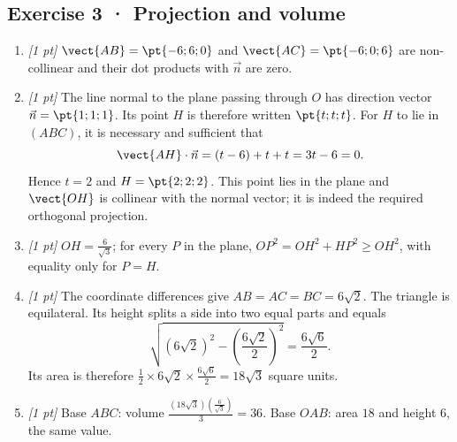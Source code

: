 \subsection*{Exercise 3 · Projection and volume}\begin{enumerate}

\item \textit{[1 pt]} $\vect{AB}=\pt{-6;6;0}$ and $\vect{AC}=\pt{-6;0;6}$ are non-collinear and their dot products with $\vec n$ are zero.

\item \textit{[1 pt]} The line normal to the plane passing through $O$ has direction vector $\vec n=\pt{1;1;1}$. Its point $H$ is therefore written $\pt{t;t;t}$. For $H$ to lie in $(ABC)$, it is necessary and sufficient that
\[\vect{AH}\cdot\vec n=(t-6)+t+t=3t-6=0.\]
Hence $t=2$ and $H=\pt{2;2;2}$. This point lies in the plane and $\vect{OH}$ is collinear with the normal vector; it is indeed the required orthogonal projection.

\item \textit{[1 pt]} $OH=\frac{6}{\sqrt{3}}$; for every $P$ in the plane, $OP^2=OH^2+HP^2\ge OH^2$, with equality only for $P=H$.

\item \textit{[1 pt]} The coordinate differences give $AB=AC=BC=6\sqrt2$. The triangle is equilateral. Its height splits a side into two equal parts and equals
\[\sqrt{(6\sqrt2)^2-(\frac{6\sqrt{2}}{2})^2}=\frac{6\sqrt6}{2}.\]
Its area is therefore $\frac12\times 6\sqrt2\times\frac{6\sqrt6}{2}=18\sqrt3$ square units.

\item \textit{[1 pt]} Base $ABC$: volume $\frac{(18\sqrt3)(\frac{6}{\sqrt{3}})}{3}=36$. Base $OAB$: area $18$ and height $6$, the same value.

\end{enumerate}

